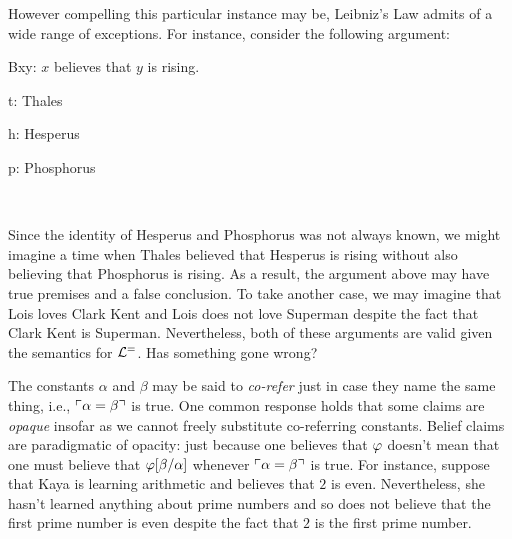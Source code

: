 However compelling this particular instance may be, Leibniz's Law admits of a wide range of exceptions.
For instance, consider the following argument:
\begin{multicols}{2}
  \begin{ekey}
      \item[Bxy:] $x$ believes that $y$ is rising.
      \item[t:] Thales
      \item[h:] Hesperus
      \item[p:] Phosphorus
  \end{ekey}

  \begin{earg}
    \item[] ~
  \end{earg}
\end{multicols}
Since the identity of Hesperus and Phosphorus was not always known, we might imagine a time when Thales believed that Hesperus is rising without also believing that Phosphorus is rising.
As a result, the argument above may have true premises and a false conclusion.
To take another case, we may imagine that Lois loves Clark Kent and Lois does not love Superman despite the fact that Clark Kent is Superman.
Nevertheless, both of these arguments are valid given the semantics for $\mathcal{L}^{=}$.
Has something gone wrong?

The constants $\alpha$ and $\beta$ may be said to \textit{co-refer} just in case they name the same thing, i.e., $\ulcorner\alpha=\beta\urcorner$ is true.
One common response holds that some claims are \textit{opaque} insofar as we cannot freely substitute co-referring constants. %
Belief claims are paradigmatic of opacity: just because one believes that $\varphi$ doesn't mean that one must believe that $\varphi[\beta/\alpha]$ whenever $\ulcorner\alpha=\beta\urcorner$ is true.
For instance, suppose that Kaya is learning arithmetic and believes that $2$ is even.
Nevertheless, she hasn't learned anything about prime numbers and so does not believe that the first prime number is even despite the fact that $2$ is the first prime number. 

